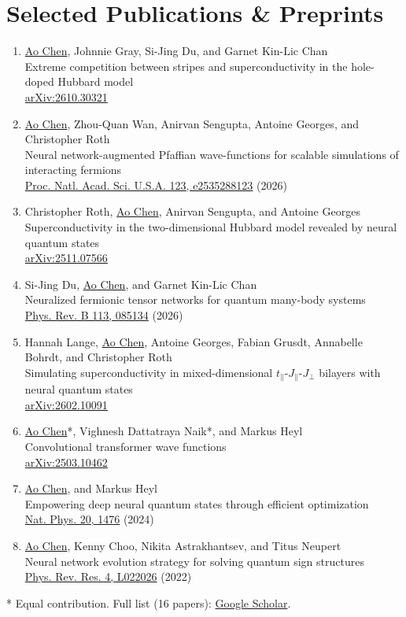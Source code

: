 \documentclass[a4paper,11pt]{article}
\newcommand{\me}{\uline{Ao Chen}}
\newcommand{\pub}[4]{\item \small #1\\ #2\\ \href{#3}{#4}\vspace{2pt}}
\begin{document}
\section{Selected Publications \& Preprints}
\begin{enumerate}[leftmargin=0.4in, itemsep=2pt]
  \pub{\me, Johnnie Gray, Si-Jing Du, and Garnet Kin-Lic Chan}
      {Extreme competition between stripes and superconductivity in the hole-doped Hubbard model}
      {https://arxiv.org/abs/2610.30321}{arXiv:2610.30321}
  \pub{\me, Zhou-Quan Wan, Anirvan Sengupta, Antoine Georges, and Christopher Roth}
      {Neural network-augmented Pfaffian wave-functions for scalable simulations of interacting fermions}
      {https://arxiv.org/abs/2507.10705}{Proc. Natl. Acad. Sci. U.S.A. 123, e2535288123} (2026)
  \pub{Christopher Roth, \me, Anirvan Sengupta, and Antoine Georges}
      {Superconductivity in the two-dimensional Hubbard model revealed by neural quantum states}
      {https://arxiv.org/abs/2511.07566}{arXiv:2511.07566}
  \pub{Si-Jing Du, \me, and Garnet Kin-Lic Chan}
      {Neuralized fermionic tensor networks for quantum many-body systems}
      {https://arxiv.org/abs/2506.08329}{Phys. Rev. B 113, 085134} (2026)
  \pub{Hannah Lange, \me, Antoine Georges, Fabian Grusdt, Annabelle Bohrdt, and Christopher Roth}
      {Simulating superconductivity in mixed-dimensional $t_\parallel$-$J_\parallel$-$J_\perp$ bilayers with neural quantum states}
      {https://arxiv.org/abs/2602.10091}{arXiv:2602.10091}
  \pub{\me*, Vighnesh Dattatraya Naik*, and Markus Heyl}
      {Convolutional transformer wave functions}
      {https://arxiv.org/abs/2503.10462}{arXiv:2503.10462}
  \item \label{pub:natphys} \small \me, and Markus Heyl\\
      Empowering deep neural quantum states through efficient optimization\\
      \href{https://www.nature.com/articles/s41567-024-02566-1}{Nat. Phys. 20, 1476} (2024)\vspace{2pt}
  \pub{\me, Kenny Choo, Nikita Astrakhantsev, and Titus Neupert}
      {Neural network evolution strategy for solving quantum sign structures}
      {https://journals.aps.org/prresearch/abstract/10.1103/PhysRevResearch.4.L022026}{Phys. Rev. Res. 4, L022026} (2022)
\end{enumerate}
\vspace{-6pt}
{\small \hspace{0.15in}* Equal contribution. Full list (16 papers): \href{https://scholar.google.com/citations?user=ZEzFjXsAAAAJ}{Google Scholar}.}
\end{document}
